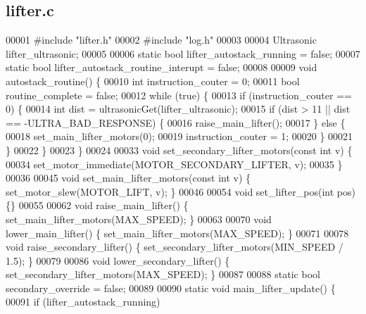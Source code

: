 \subsection{lifter.\+c}
\label{lifter_8c_source}

\begin{DoxyCode}
00001 \textcolor{preprocessor}{#include "lifter.h"}
00002 \textcolor{preprocessor}{#include "log.h"}
00003 
00004 Ultrasonic lifter_ultrasonic;
00005 
00006 \textcolor{keyword}{static} \textcolor{keywordtype}{bool} lifter_autostack_running = \textcolor{keyword}{false};
00007 \textcolor{keyword}{static} \textcolor{keywordtype}{bool} lifter_autostack_routine_interupt = \textcolor{keyword}{false};
00008 
00009 \textcolor{keywordtype}{void} autostack_routine() \{
00010   \textcolor{keywordtype}{int} instruction\_couter = 0;
00011   \textcolor{keywordtype}{bool} routine\_complete = \textcolor{keyword}{false};
00012   \textcolor{keywordflow}{while} (\textcolor{keyword}{true}) \{
00013     \textcolor{keywordflow}{if} (instruction\_couter == 0) \{
00014       \textcolor{keywordtype}{int} dist = ultrasonicGet(lifter_ultrasonic);
00015       \textcolor{keywordflow}{if} (dist > 11 || dist == -ULTRA\_BAD\_RESPONSE) \{
00016         raise_main_lifter();
00017       \} \textcolor{keywordflow}{else} \{
00018         set_main_lifter_motors(0);
00019         instruction\_couter = 1;
00020       \}
00021     \}
00022   \}
00023 \}
00024 
00033 \textcolor{keywordtype}{void} set_secondary_lifter_motors(\textcolor{keyword}{const} \textcolor{keywordtype}{int} v) \{
00034   set_motor_immediate(MOTOR_SECONDARY_LIFTER, v);
00035 \}
00036 
00045 \textcolor{keywordtype}{void} set_main_lifter_motors(\textcolor{keyword}{const} \textcolor{keywordtype}{int} v) \{ set_motor_slew(MOTOR_LIFT, v); \}
00046 
00054 \textcolor{keywordtype}{void} set_lifter_pos(\textcolor{keywordtype}{int} pos) \{\}
00055 
00062 \textcolor{keywordtype}{void} raise_main_lifter() \{ set_main_lifter_motors(MAX_SPEED); \}
00063 
00070 \textcolor{keywordtype}{void} lower_main_lifter() \{ set_main_lifter_motors(MAX_SPEED); \}
00071 
00078 \textcolor{keywordtype}{void} raise_secondary_lifter() \{ set_secondary_lifter_motors(MIN_SPEED / 1.5); \}
00079 
00086 \textcolor{keywordtype}{void} lower_secondary_lifter() \{ set_secondary_lifter_motors(MAX_SPEED); \}
00087 
00088 \textcolor{keyword}{static} \textcolor{keywordtype}{bool} secondary_override = \textcolor{keyword}{false};
00089 
00090 \textcolor{keyword}{static} \textcolor{keywordtype}{void} main_lifter_update() \{
00091   \textcolor{keywordflow}{if} (lifter_autostack_running)

\end{DoxyCode}
